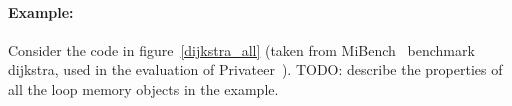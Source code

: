 



\paragraph{Example:}
Consider the code in figure~\ref{dijkstra_all} (taken from MiBench~\cite{} benchmark
dijkstra, used in the evaluation of Privateer~\cite{}).
TODO: describe the properties of all the loop memory objects in the example.


